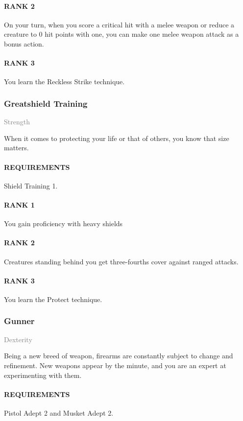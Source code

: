 \paragraph{RANK 2} On your turn, when you score a critical hit with a melee weapon or reduce a creature to 0 hit points with one, you can make one melee weapon attack as a bonus action.
\paragraph{RANK 3} You learn the Reckless Strike technique.

\subsubsection{Greatshield Training} \label{tal::greatshieldtraining}
\small{\textcolor{gray}{Strength}}

\normalsize
When it comes to protecting your life or that of others, you know that size matters.
\paragraph{REQUIREMENTS} Shield Training 1.
\paragraph{RANK 1} You gain proficiency with heavy shields
\paragraph{RANK 2} Creatures standing behind you get three-fourths cover against ranged attacks.
\paragraph{RANK 3} You learn the Protect technique.

\subsubsection{Gunner} \label{tal::gunner}
\small{\textcolor{gray}{Dexterity}}

\normalsize
Being a new breed of weapon, firearms are constantly subject to change and refinement.
New weapons appear by the minute, and you are an expert at experimenting with them.
\paragraph{REQUIREMENTS} Pistol Adept 2 and Musket Adept 2.
